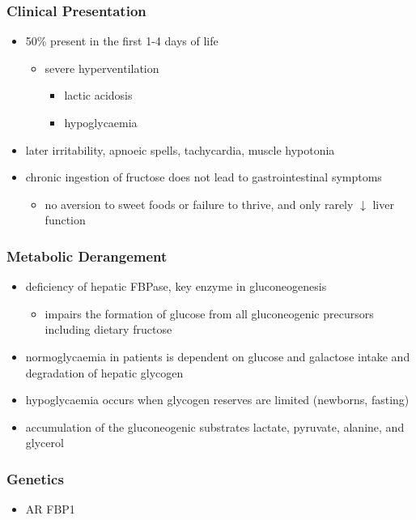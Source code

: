 \documentclass{scrartcl}
\begin{document}
\subsubsection{Clinical Presentation}
\label{sec:org74fc944}
\begin{itemize}
\item 50\% present in the first 1-4 days of life
\begin{itemize}
\item severe hyperventilation
\begin{itemize}
\item lactic acidosis
\item hypoglycaemia
\end{itemize}
\end{itemize}
\item later irritability, apnoeic spells, tachycardia, muscle hypotonia
\item chronic ingestion of fructose does not lead to gastrointestinal symptoms
\begin{itemize}
\item no aversion to sweet foods or failure to thrive, and only rarely \(\downarrow\) liver function
\end{itemize}
\end{itemize}

\subsubsection{Metabolic Derangement}
\label{sec:org77249ee}
\begin{itemize}
\item deficiency of hepatic FBPase, key enzyme in gluconeogenesis
\begin{itemize}
\item impairs the formation of glucose from all gluconeogenic precursors including dietary fructose
\end{itemize}
\item normoglycaemia in patients is dependent on glucose and galactose
intake and degradation of hepatic glycogen
\item hypoglycaemia occurs when glycogen reserves are limited (newborns, fasting)
\item accumulation of the gluconeogenic substrates lactate, pyruvate, alanine, and glycerol
\end{itemize}
\subsubsection{Genetics}
\label{sec:org2d68e20}
\begin{itemize}
\item AR FBP1
\end{itemize}
\end{document}

